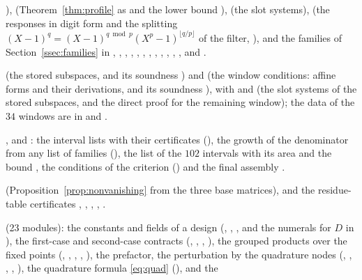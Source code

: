 \begin{description}[leftmargin=1.5em,style=nextline]
),
 (Theorem~\ref{thm:profile} as  and the lower bound
),  (the slot systems),  (the responses in
digit form and the splitting $(X-1)^q=(X-1)^{q\bmod p}(X^p-1)^{\lfloor q/p\rfloor}$ of the filter,
), and the families of
Section~\ref{ssec:families} in , , , , ,
, , , , , , ,
 and .
\item[Stored data]  (the stored subspaces,  and its soundness
) and  (the window conditions: affine forms and
their derivations,  and its soundness ), with
 and  (the slot systems of the stored subspaces, and the
direct proof for the remaining window); the data of the $34$ windows are in
 and .
\item[The profile of $D$] ,  and : the
interval lists with their certificates (), the growth of the denominator from any list of
families (), the list  of the $102$ intervals with its area
 and the bound , the conditions of the criterion () and the
final assembly .
\item[Nonvanishing]  (Proposition~\ref{prop:nonvanishing} from the three base matrices),
and the residue-table certificates , , , ,
.
\item[Real place]  (23 modules): the constants and fields of a design (,
, , and the numerals for $D$ in ), the first-case and
second-case contracts (,
, , ), the grouped products over the fixed points (,
, , , ), the prefactor,
the perturbation by the quadrature nodes (, , ,
, ), the quadrature formula \eqref{eq:quad} (), and the

\end{description}
